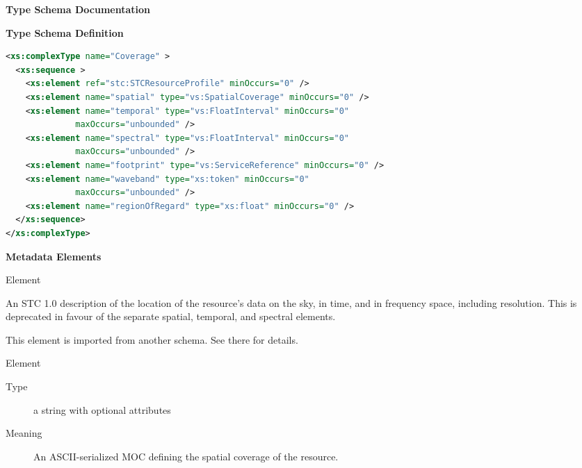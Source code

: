 \documentclass[11pt,a4paper]{ivoa}
\begin{document}
\begin{generated}
\begingroup
      	\renewcommand*\descriptionlabel[1]{%
      	\hbox to 5.5em{\emph{#1}\hfil}}\vspace{2ex}\noindent\textbf{ Type Schema Documentation}


\vspace{1ex}\noindent\textbf{ Type Schema Definition}

\begin{lstlisting}[language=XML,basicstyle=\footnotesize]
<xs:complexType name="Coverage" >
  <xs:sequence >
    <xs:element ref="stc:STCResourceProfile" minOccurs="0" />
    <xs:element name="spatial" type="vs:SpatialCoverage" minOccurs="0" />
    <xs:element name="temporal" type="vs:FloatInterval" minOccurs="0"
              maxOccurs="unbounded" />
    <xs:element name="spectral" type="vs:FloatInterval" minOccurs="0"
              maxOccurs="unbounded" />
    <xs:element name="footprint" type="vs:ServiceReference" minOccurs="0" />
    <xs:element name="waveband" type="xs:token" minOccurs="0"
              maxOccurs="unbounded" />
    <xs:element name="regionOfRegard" type="xs:float" minOccurs="0" />
  </xs:sequence>
</xs:complexType>
\end{lstlisting}

\vspace{0.5ex}\noindent\textbf{ Metadata Elements}

\begingroup\small\begin{bigdescription}\item[Element \xmlel{stc:STCResourceProfile}]

                 An STC 1.0 description of the location of the resource's 
                 data on the sky, in time, and in frequency space, 
                 including resolution.   This is deprecated in favour
                 of the separate spatial, temporal, and spectral elements.
               

This element is imported from another schema.  See
	     		 there for details.\item[Element \xmlel{spatial}]
\begin{description}
\item[Type] a string with optional attributes
\item[Meaning] 
                  An ASCII-serialized MOC defining the spatial coverage 
                  of the resource.
               

\end{description}
\end{bigdescription}
\end{generated}
\end{document}

